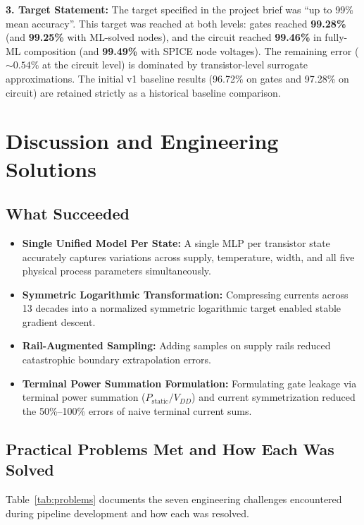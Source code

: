 \documentclass[11pt,a4paper]{article}
\numberwithin{table}{section}
\numberwithin{figure}{section}
\begin{document}
\textbf{3. Target Statement:}
The target specified in the project brief was ``up to 99\% mean accuracy''. This target was reached at both levels: gates reached \textbf{99.28\%} (and \textbf{99.25\%} with ML-solved nodes), and the circuit reached \textbf{99.46\%} in fully-ML composition (and \textbf{99.49\%} with SPICE node voltages). The remaining error ($\sim 0.54\%$ at the circuit level) is dominated by transistor-level surrogate approximations. The initial v1 baseline results (96.72\% on gates and 97.28\% on circuit) are retained strictly as a historical baseline comparison.

\section{Discussion and Engineering Solutions}
\subsection{What Succeeded}
\begin{itemize}[noitemsep]
    \item \textbf{Single Unified Model Per State:} A single MLP per transistor state accurately captures variations across supply, temperature, width, and all five physical process parameters simultaneously.
    \item \textbf{Symmetric Logarithmic Transformation:} Compressing currents across 13 decades into a normalized symmetric logarithmic target enabled stable gradient descent.
    \item \textbf{Rail-Augmented Sampling:} Adding samples on supply rails reduced catastrophic boundary extrapolation errors.
    \item \textbf{Terminal Power Summation Formulation:} Formulating gate leakage via terminal power summation ($P_{\mathrm{static}}/V_{DD}$) and current symmetrization reduced the 50\%--100\% errors of naive terminal current sums.
\end{itemize}

\subsection{Practical Problems Met and How Each Was Solved}
Table~\ref{tab:problems} documents the seven engineering challenges encountered during pipeline development and how each was resolved.
\end{document}
